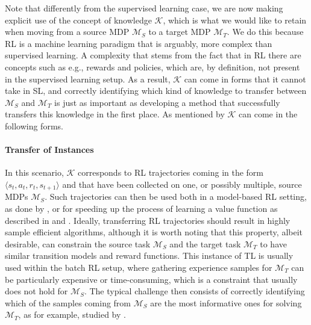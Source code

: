 Note that differently from the supervised learning case, we are now making explicit use of the concept of knowledge $\mathcal{K}$, which is what we would like to retain when moving from a source MDP $\mathcal{M}_S$ to a target MDP $\mathcal{M}_T$. We do this because RL is a machine learning paradigm that is arguably, more complex than supervised learning. A complexity that stems from the fact that in RL there are concepts such as e.g., rewards and policies, which are, by definition, not present in the supervised learning setup. As a result, $\mathcal{K}$ can come in forms that it cannot take in SL, and correctly identifying which kind of knowledge to transfer between $\mathcal{M}_S$ and $\mathcal{M}_T$ is just as important as developing a method that successfully transfers this knowledge in the first place. As mentioned by \citet{lazaric2012transfer} $\mathcal{K}$ can come in the following forms.

\paragraph{\textbf{\uppercase{T}ransfer of \uppercase{I}nstances}} In this scenario, $\mathcal{K}$ corresponds to RL trajectories coming in the form $\langle s_t, a_t, r_t, s_{t+1}\rangle$ and that have been collected on one, or possibly multiple, source MDPs $\mathcal{M}_S$. Such trajectories can then be used both in a model-based RL setting, as done by \citet{taylor2008transferring}, or for speeding up the process of learning a value function as described in \cite{lazaric2008transfer} and \cite{laroche2017transfer}. Ideally, transferring RL trajectories should result in highly sample efficient algorithms, although it is worth noting that this property, albeit desirable, can constrain the source task $\mathcal{M}_S$ and the target task $\mathcal{M}_T$ to have similar transition models and reward functions. This instance of TL is usually used within the batch RL setup, where gathering experience samples for $\mathcal{M}_T$ can be particularly expensive or time-consuming, which is a constraint that usually does not hold for $\mathcal{M}_S$. The typical challenge then consists of correctly identifying which of the samples coming from $\mathcal{M}_S$ are the most informative ones for solving $\mathcal{M}_T$, as for example, studied by \citet{tirinzoni2018importance}.

